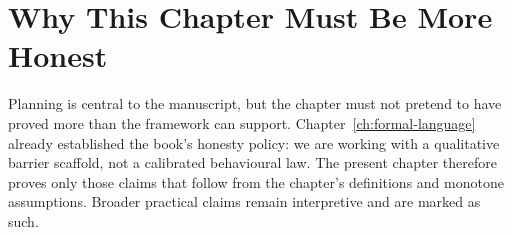 \section{Why This Chapter Must Be More Honest}

Planning is central to the manuscript, but the chapter must not pretend to have
proved more than the framework can support. Chapter~\ref{ch:formal-language}
already established the book's honesty policy: we are working with a
qualitative barrier scaffold, not a calibrated behavioural law. The present
chapter therefore proves only those claims that follow from the chapter's
definitions and monotone assumptions. Broader practical claims remain
interpretive and are marked as such.
